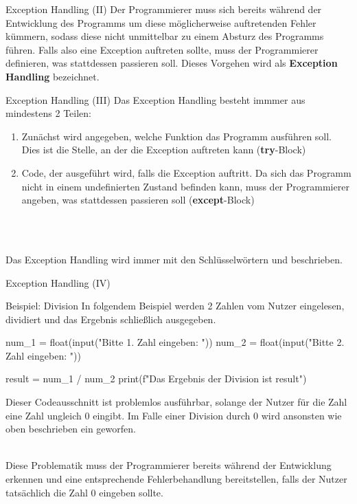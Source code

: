     \begin{frame}[fragile]{Exception Handling (II)}
        Der Programmierer muss sich bereits während der Entwicklung des Programms um diese möglicherweise auftretenden Fehler kümmern, sodass diese nicht unmittelbar zu einem Absturz des Programms führen. Falls also eine Exception auftreten sollte, muss der Programmierer definieren, was stattdessen passieren soll. Dieses Vorgehen wird als \textbf{Exception Handling} bezeichnet.
    \end{frame}
    
    \begin{frame}[fragile]{Exception Handling (III)}
        Das Exception Handling besteht immmer aus mindestens 2 Teilen:
        \begin{enumerate}
            \item Zunächst wird angegeben, welche Funktion das Programm ausführen soll. Dies ist die Stelle, an der die Exception auftreten kann (\textbf{try}-Block)
            \item Code, der ausgeführt wird, falls die Exception auftritt. Da sich das Programm nicht in einem undefinierten Zustand befinden kann, muss der Programmierer angeben, was stattdessen passieren soll (\textbf{except}-Block)
        \end{enumerate}\\~\
        
        Das Exception Handling wird immer mit den Schlüsselwörtern  und  beschrieben.
    \end{frame}
    
    \begin{frame}[fragile]{Exception Handling (IV)}

    
\begin{exampleblock}{Beispiel: Division}
In folgendem Beispiel werden 2 Zahlen vom Nutzer eingelesen, dividiert und das Ergebnis schließlich ausgegeben.

\begin{pythoncode}
num_1 = float(input("Bitte 1. Zahl eingeben: "))
num_2 = float(input("Bitte 2. Zahl eingeben: "))

result = num_1 / num_2
print(f"Das Ergebnis der Division ist {result}")
\end{pythoncode}

Dieser Codeausschnitt ist problemlos ausführbar, solange der Nutzer für die Zahl  eine Zahl ungleich 0 eingibt. Im Falle einer Division durch 0 wird ansonsten wie oben beschrieben ein  geworfen.\\~\

Diese Problematik muss der Programmierer bereits während der Entwicklung erkennen und eine entsprechende Fehlerbehandlung bereitstellen, falls der Nutzer tatsächlich die Zahl 0 eingeben sollte.
\end{exampleblock}    

    \end{frame}
    
